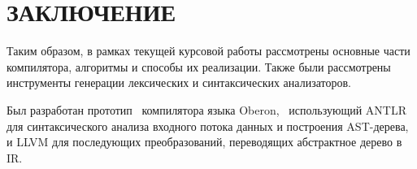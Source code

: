 \section*{ЗАКЛЮЧЕНИЕ}
Таким образом, в рамках текущей курсовой работы рассмотрены основные части компилятора, алгоритмы и способы их реализации. Также были рассмотрены инструменты генерации лексических и синтаксических анализаторов. 

Был разработан прототип \, компилятора языка Oberon, \, использующий ANTLR для синтаксического анализа входного потока данных и построения AST-дерева, и LLVM для последующих преобразований, переводящих абстрактное дерево в IR.


\pagebreak